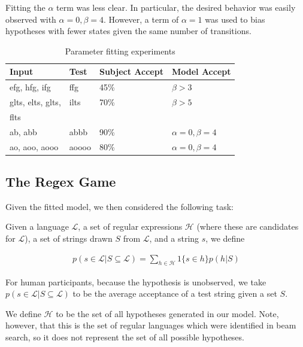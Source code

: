 \documentclass[10pt,letterpaper]{article}
\begin{document}
Fitting the $\alpha$ term was less clear. In particular, the desired behavior was easily observed with $\alpha=0,\beta=4$. However, a term of $\alpha=1$ was used to bias hypotheses with fewer states given the same number of transitions.

\begin{table}[!ht]
\begin{center} 
\caption{Parameter fitting experiments} 
\label{parameter-table} 
\vskip 0.12in
\begin{tabular}{llll} 
\hline
Input  & Test & Subject Accept & Model Accept
\\ \hline
efg, hfg, ifg & ffg & 45\% & $\beta > 3$
\\ \hline
glts, elts, glts, & ilts & 70\% & $\beta > 5$
\\ flts
\\ \hline
ab, abb & abbb & 90\% & $\alpha = 0, \beta = 4$
\\ \hline
ao, aoo, aooo & aoooo & 80\% & $\alpha = 0, \beta=4$
\\ \hline
\end{tabular} 
\end{center} 
\end{table}

\subsection{The Regex Game}
Given the fitted model, we then considered the following task: 

Given a language $\mathcal{L}$, a set of regular expressions $\mathcal{H}$ (where these are candidates for $\mathcal{L}$), a set of strings drawn $S$ from $\mathcal{L}$, and a string $s$, we define

\begin{align*}
	p(s \in \mathcal{L} | S \subseteq {\mathcal{L}}) = \sum_{h \in \mathcal{H}} 1 \{s \in h\} p(h|S)
\end{align*}

For human participants, because the hypothesis is unobserved, we take $p(s \in \mathcal{L} | S \subseteq {\mathcal{L}}) $ to be the average acceptance of a test string given a set $S$. 

We define $\mathcal{H}$ to be the set of all hypotheses generated in our model. Note, however, that this is the set of regular languages which were identified in beam search, so it does not represent the set of all possible hypotheses.
\end{document}
